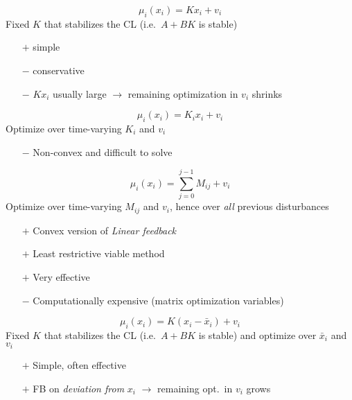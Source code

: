 \begin{equation*}
    \mu_i(x_i) = Kx_i + v_i
\end{equation*}
Fixed $K$ that stabilizes the CL (i.e.\ $A + BK$ is stable)
\begin{itemize}
    \item [$+$] simple
    \item [$-$] conservative
    \item [$-$] $K x_i$ usually large $\rightarrow$ remaining optimization in $v_i$ shrinks
\end{itemize}

\newpar{}
\begin{equation*}
    \mu_i(x_i) = K_i x_i + v_i
\end{equation*}
Optimize over time-varying $K_i$  and $v_i$
\begin{itemize}
    \item [$-$] Non-convex and difficult to solve
\end{itemize}

\newpar{}
\begin{equation*}
    \mu_i(x_i) = \sum_{j=0}^{j-1} M_{ij} + v_i
\end{equation*}
Optimize over time-varying $M_{ij}$ and $v_i$, hence over \textit{all} previous disturbances
\begin{itemize}
    \item [$+$]Convex version of \textit{Linear feedback}
    \item [$+$]Least restrictive viable method
    \item [$+$] Very effective
    \item [$-$] Computationally expensive (matrix optimization variables)
\end{itemize}

\newpar{}
\begin{equation*}
    \mu_i(x_i) = K(x_i - \bar{x}_i) + v_i
\end{equation*}
Fixed $K$ that stabilizes the CL (i.e.\ $A + BK$ is stable) and optimize over $\bar{x}_i$ and $v_i$
\begin{itemize}
    \item [$+$] Simple, often effective
    \item [$+$] FB on \textit{deviation from} $x_i$ $\rightarrow$ remaining opt.\ in $v_i$ grows
\end{itemize}

